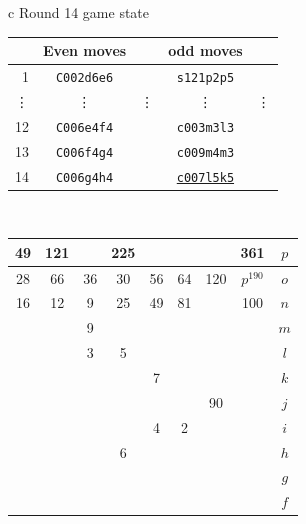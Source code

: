 \documentclass[12pt]{article}
\begin{document}
{\small{
\begin{tabular}{c}
Round 14 game state \\
\begin{tabular}{r|cc|cc}
 & Even moves &    & odd moves &  \\    \hline 
1   &  {\tt C002d6e6} & \quad &  {\tt s121p2p5} & \quad \\
\vdots &  \vdots    & \vdots  & \vdots    & \vdots \\  
12  &  {\tt C006e4f4} & \quad &  {\tt c003m3l3} & \quad \\
13  &  {\tt C006f4g4} & \quad &  {\tt c009m4m3} & \quad \\
14  &  {\tt C006g4h4} & \quad & \underline{\tt c007l5k5} & \quad \\
\end{tabular}
\\
\begin{tabular}{|c|c|c|c|c|c|c|c||c} \hline
\squadfill{\,}49 & \squadfill{\,}121 & \quad & \squadfill{\,}225 & \quad & \quad & \quad & \squadfill{\,}361 & $p$ \\ \hline
\squadfill{\,}28 & \squadfill{\,}66 & \trianglepafill{\,}36 & \trianglepafill{\,}30 & \trianglepafill{\,}56 & \trianglepafill{\,}64 & \squadfill{\,}120 & \rhombusfill{\,}$p^{190}$ & $o$ \\ \hline
\trianglepafill{\,}16 & \trianglepafill{\,}12 & \circletfill{\,}9 & \circletfill{\,}25 & \circletfill{\,}49 & \circletfill{\,}81 & \quad & \trianglepafill{\,}100 & $n$ \\ \hline
\quad & \quad & \circletfill{\,}9 & \quad & \quad & \quad & \quad & \quad & $m$ \\ \hline
\quad & \quad & \circletfill{\,}3 & \circletfill{\,}5 & \quad & \quad & \quad & \quad & $l$ \\ \hline
\quad & \quad & \quad & \quad & \circletfill{\,}7 & \quad & \quad & \quad & $k$ \\ \hline
\quad & \quad & \quad & \quad & \quad & \quad & \trianglepafill{\,}90 & \quad & $j$ \\ \hline
\quad & \quad & \quad & \quad & \circlet{\,}4 & \circlet{\,}2 & \quad & \quad & $i$ \\ \hline
\quad & \quad & \quad & \circlet{\,}6 & \quad & \quad & \quad & \quad & $h$ \\ \hline
\quad & \quad & \quad & \quad & \quad & \quad & \quad & \quad & $g$ \\ \hline
\quad & \quad & \quad & \quad & \quad & \quad & \quad & \quad & $f$ \\ \hline

\end{tabular}
\end{tabular}}}
\end{document}
